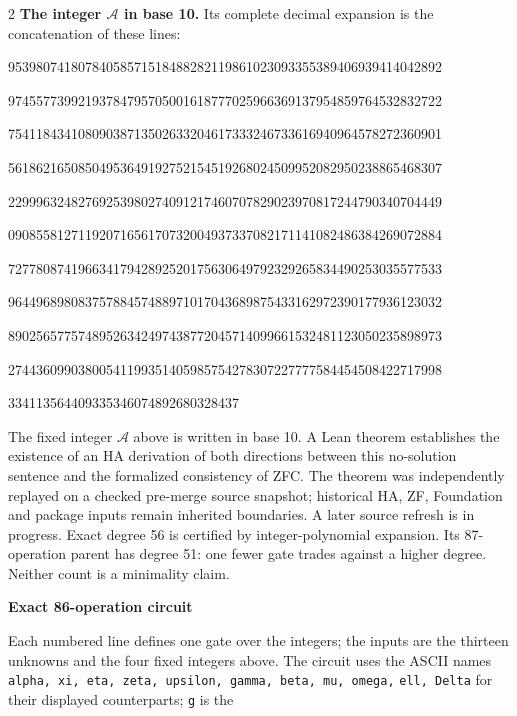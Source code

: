 \documentclass[10pt]{article}
\begin{document}
\begin{multicols}{2}
\textbf{The integer $\mathcal A$ in base 10.}
Its complete decimal expansion is the concatenation of these lines:\par
\begingroup\fontsize{7.7}{8.2}\selectfont{}\par
95398074180784058571518488282119861023093355389406939414042892\par
97455773992193784795705001618777025966369137954859764532832722\par
75411843410809038713502633204617333246733616940964578272360901\par
56186216508504953649192752154519268024509952082950238865468307\par
22999632482769253980274091217460707829023970817244790340704449\par
09085581271192071656170732004937337082171141082486384269072884\par
72778087419663417942892520175630649792329265834490253035577533\par
96449689808375788457488971017043689875433162972390177936123032\par
89025657757489526342497438772045714099661532481123050235898973\par
27443609903800541199351405985754278307227777584454508422717998\par
334113564409335346074892680328437\par
\endgroup
\normalfont\fontsize{7.7}{8.2}\selectfont
The fixed integer $\mathcal A$ above is written in base 10. A Lean theorem
establishes the existence of an HA derivation of both directions between
this no-solution sentence and the formalized consistency of ZFC. The theorem
was independently replayed on a checked pre-merge source snapshot; historical
HA, ZF, Foundation and package inputs remain inherited boundaries. A later
source refresh is in progress. Exact degree 56 is certified by integer-polynomial expansion. Its 87-operation
parent has degree 51: one fewer gate trades against a higher degree. Neither
count is a minimality claim.
\end{multicols}
\clearpage
\begin{center}{\large\bfseries Exact 86-operation circuit}\end{center}
Each numbered line defines one gate over the integers; the inputs are the
thirteen unknowns and the four fixed integers above. The circuit uses the
ASCII names \texttt{alpha, xi, eta, zeta, upsilon, gamma, beta, mu, omega,}
\texttt{ell, Delta} for their displayed counterparts; \texttt{g} is the
\end{document}
